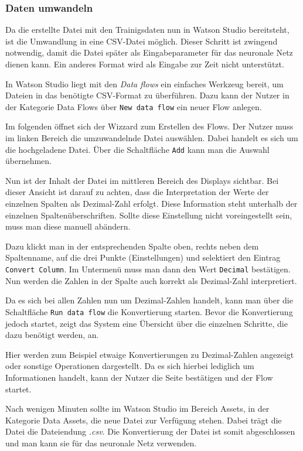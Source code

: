 \subsubsection{Daten umwandeln}
Da die erstellte Datei mit den Trainigsdaten nun in Watson Studio bereitsteht, ist die Umwandlung in eine CSV-Datei
möglich. Dieser Schritt ist zwingend notwendig, damit die Datei später als Eingabeparameter für das neuronale Netz
dienen kann. Ein anderes Format wird als Eingabe zur Zeit nicht unterstützt.

In Watson Studio liegt mit den \textit{Data flows} ein einfaches Werkzeug bereit, um Dateien in das benötigte CSV-Format
zu überführen. Dazu kann der Nutzer in der Kategorie Data Flows über \texttt{New data flow} ein neuer Flow anlegen.

Im folgenden öffnet sich der Wizzard zum Erstellen des Flows. Der Nutzer muss im linken Bereich die umzuwandelnde Datei
auswählen. Dabei handelt es sich um die hochgeladene Datei. Über die Schaltfläche \texttt{Add} kann man die Auswahl
übernehmen.

Nun ist der Inhalt der Datei im mittleren Bereich des Displays sichtbar. Bei dieser Ansicht ist darauf zu achten, dass
die Interpretation der Werte der einzelnen Spalten als Dezimal-Zahl erfolgt. Diese Information steht unterhalb der
einzelnen Spaltenüberschriften. Sollte diese Einstellung nicht voreingestellt sein, muss man diese manuell abändern.

Dazu klickt man in der entsprechenden Spalte oben, rechts neben dem Spaltenname, auf die drei Punkte (Einstellungen) und
selektiert den Eintrag \texttt{Convert Column}. Im Untermenü muss man dann den Wert \texttt{Decimal} bestätigen. Nun
werden die Zahlen in der Spalte auch korrekt als Dezimal-Zahl interpretiert.

Da es sich bei allen Zahlen nun um Dezimal-Zahlen handelt, kann man über die Schaltfläche \texttt{Run data flow} die
Konvertierung starten. Bevor die Konvertierung jedoch startet, zeigt das System eine Übersicht über die einzelnen
Schritte, die dazu benötigt werden, an.

Hier werden zum Beispiel etwaige Konvertierungen zu Dezimal-Zahlen angezeigt oder sonstige Operationen dargestellt. Da
es sich hierbei lediglich um Informationen handelt, kann der Nutzer die Seite bestätigen und der Flow startet.

Nach wenigen Minuten sollte im Watson Studio im Bereich Assets, in der Kategorie Data Assets, die neue Datei zur
Verfügung stehen. Dabei trägt die Datei die Dateiendung \textit{.csv}. Die Konvertierung der Datei ist somit
abgeschlossen und man kann sie für das neuronale Netz verwenden.

